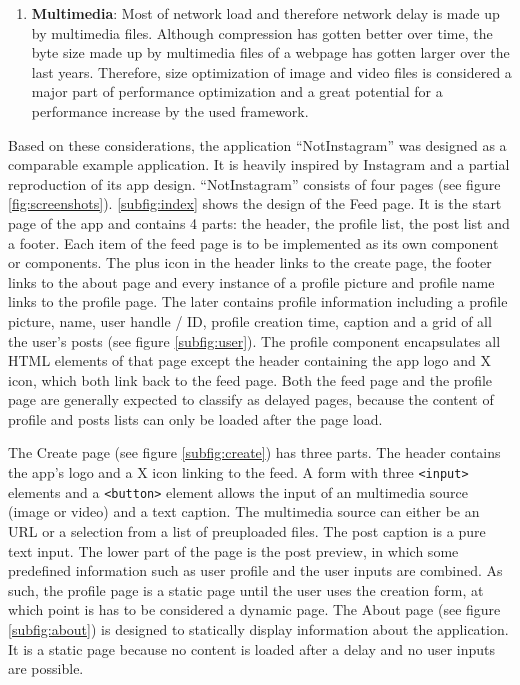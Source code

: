 \documentclass[a4paper, fontsize=11pt]{article}
\begin{document}
\begin{enumerate}
  \item \textbf{Multimedia}: Most of network load and therefore network delay is made up by multimedia files.
  Although compression has gotten better over time, the byte size made up by multimedia files of a webpage has gotten larger over the last years. %
  Therefore, size optimization of image and video files is considered a major part of performance optimization and a great potential for a performance increase by the used framework.

\end{enumerate}

Based on these considerations, the application \enquote{NotInstagram} was designed as a comparable example application.
It is heavily inspired by Instagram and a partial reproduction of its app design. %
\enquote{NotInstagram} consists of four pages (see figure \ref{fig:screenshots}).
\ref{subfig:index} shows the design of the Feed page.
It is the start page of the app and contains 4 parts: the header, the profile list, the post list and a footer.
Each item of the feed page is to be implemented as its own component or components.
The plus icon in the header links to the create page, the footer links to the about page and every instance of a profile picture and profile name links to the profile page.
The later contains profile information including a profile picture, name, user handle / ID, profile creation time, caption and a grid of all the user's posts (see figure \ref{subfig:user}).
The profile component encapsulates all HTML elements of that page except the header containing the app logo and X icon, which both link back to the feed page.
Both the feed page and the profile page are generally expected to classify as delayed pages, because the content of profile and posts lists can only be loaded after the page load.

The Create page (see figure \ref{subfig:create}) has three parts.
The header contains the app's logo and a X icon linking to the feed.
A form with three \verb|<input>| elements and a \verb|<button>| element allows the input of an multimedia source (image or video) and a text caption.
The multimedia source can either be an URL or a selection from a list of preuploaded files.
The post caption is a pure text input.
The lower part of the page is the post preview, in which some predefined information such as user profile and the user inputs are combined.
As such, the profile page is a static page until the user uses the creation form, at which point is has to be considered a dynamic page.
The About page (see figure \ref{subfig:about}) is designed to statically display information about the application.
It is a static page because no content is loaded after a delay and no user inputs are possible.
\end{document}
